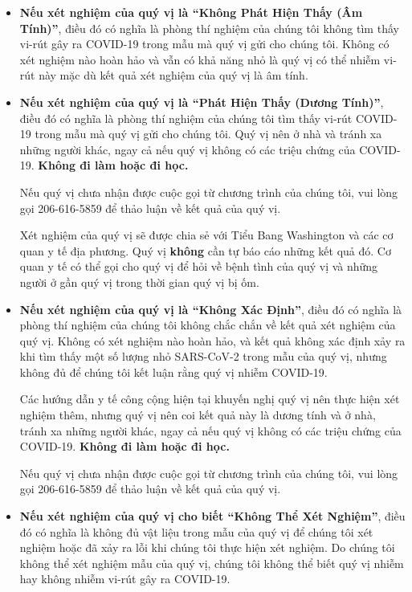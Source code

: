 \documentclass[10pt]{article}
\begin{document}
\begin{itemize}


\item

  \textbf{Nếu xét nghiệm của quý vị là ``Không Phát Hiện Thấy (Âm Tính)''}, điều
  đó có nghĩa là phòng thí nghiệm của chúng tôi không tìm thấy vi-rút gây ra
  COVID-19 trong mẫu mà quý vị gửi cho chúng tôi. Không có xét nghiệm nào hoàn
  hảo và vẫn có khả năng nhỏ là quý vị có thể nhiễm vi-rút này mặc dù kết quả
  xét nghiệm của quý vị là âm tính.

\item

  \textbf{Nếu xét nghiệm của quý vị là ``Phát Hiện Thấy (Dương Tính)''}, điều đó
  có nghĩa là phòng thí nghiệm của chúng tôi tìm thấy vi-rút COVID-19 trong mẫu
  mà quý vị gửi cho chúng tôi. Quý vị nên ở nhà và tránh xa những người khác,
  ngay cả nếu quý vị không có các triệu chứng của COVID-19. \textbf{Không đi làm
  hoặc đi học.}

  Nếu quý vị chưa nhận được cuộc gọi từ chương trình của chúng tôi, vui lòng gọi
  206-616-5859 để thảo luận về kết quả của quý vị.

  Xét nghiệm của quý vị sẽ được chia sẻ với Tiểu Bang Washington và các cơ quan
  y tế địa phương. Quý vị \textbf{không} cần tự báo cáo những kết quả đó. Cơ
  quan y tế có thể gọi cho quý vị để hỏi về bệnh tình của quý vị và những người
  ở gần quý vị trong thời gian quý vị bị ốm.

\item

  \textbf{Nếu xét nghiệm của quý vị là ``Không Xác Định''}, điều đó có nghĩa là
  phòng thí nghiệm của chúng tôi không chắc chắn về kết quả xét nghiệm của quý
  vị. Không có xét nghiệm nào hoàn hảo, và kết quả không xác định xảy ra khi tìm
  thấy một số lượng nhỏ SARS-CoV-2 trong mẫu của quý vị, nhưng không đủ để chúng
  tôi kết luận rằng quý vị nhiễm COVID-19.

  Các hướng dẫn y tế công cộng hiện tại khuyến nghị quý vị nên thực hiện xét
  nghiệm thêm, nhưng quý vị nên coi kết quả này là dương tính và ở nhà, tránh xa
  những người khác, ngay cả nếu quý vị không có các triệu chứng của COVID-19.
  \textbf{Không đi làm hoặc đi học.}

  Nếu quý vị chưa nhận được cuộc gọi từ chương trình của chúng tôi, vui lòng gọi
  206-616-5859 để thảo luận về kết quả của quý vị.

\item

  \textbf{Nếu xét nghiệm của quý vị cho biết ``Không Thể Xét Nghiệm''}, điều đó
  có nghĩa là không đủ vật liệu trong mẫu của quý vị để chúng tôi xét nghiệm
  hoặc đã xảy ra lỗi khi chúng tôi thực hiện xét nghiệm. Do chúng tôi không thể
  xét nghiệm mẫu của quý vị, chúng tôi không thể biết quý vị nhiễm hay không
  nhiễm vi-rút gây ra COVID-19.

\end{itemize}
\end{document}
